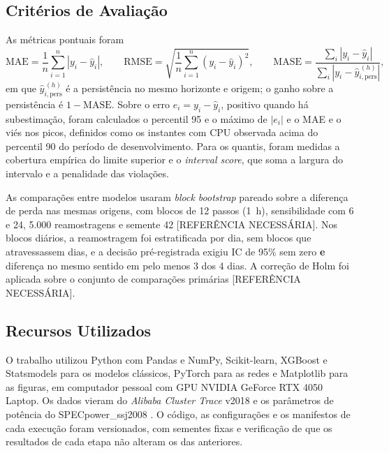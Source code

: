 \documentclass[a4paper,12pt]{article}
\newcommand{\refnec}{[REFERÊNCIA NECESSÁRIA]}
\begin{document}
\subsection{Critérios de Avaliação}
\label{sec:criterios}

As métricas pontuais foram
\begin{equation}
\mathrm{MAE} = \frac{1}{n}\sum_{i=1}^{n} |y_i - \hat{y}_i|, \qquad
\mathrm{RMSE} = \sqrt{\frac{1}{n}\sum_{i=1}^{n} (y_i - \hat{y}_i)^2}, \qquad
\mathrm{MASE} = \frac{\sum_{i} |y_i - \hat{y}_i|}{\sum_{i} |y_i - \hat{y}^{\,(h)}_{i,\mathrm{pers}}|},
\end{equation}
em que $\hat{y}^{\,(h)}_{i,\mathrm{pers}}$ é a persistência no mesmo horizonte e origem; o ganho sobre a persistência é $1 - \mathrm{MASE}$. Sobre o erro $e_i = y_i - \hat{y}_i$, positivo quando há subestimação, foram calculados o percentil 95 e o máximo de $|e_i|$ e o MAE e o viés nos picos, definidos como os instantes com CPU observada acima do percentil 90 do período de desenvolvimento. Para os quantis, foram medidas a cobertura empírica do limite superior e o \textit{interval score}, que soma a largura do intervalo e a penalidade das violações.

As comparações entre modelos usaram \textit{block bootstrap} pareado sobre a diferença de perda nas mesmas origens, com blocos de 12 passos (1~h), sensibilidade com 6 e 24, 5.000 reamostragens e semente 42 \refnec. Nos blocos diários, a reamostragem foi estratificada por dia, sem blocos que atravessassem dias, e a decisão pré-registrada exigiu IC de 95\% sem zero \textbf{e} diferença no mesmo sentido em pelo menos 3 dos 4 dias. A correção de Holm foi aplicada sobre o conjunto de comparações primárias \refnec.

\subsection{Recursos Utilizados}

O trabalho utilizou Python com Pandas e NumPy, Scikit-learn, XGBoost e Statsmodels para os modelos clássicos, PyTorch para as redes e Matplotlib para as figuras, em computador pessoal com GPU NVIDIA GeForce RTX 4050 Laptop. Os dados vieram do \textit{Alibaba Cluster Trace} v2018 \cite{alibaba2018clusterdata} e os parâmetros de potência do SPECpower\_ssj2008 \cite{spec2008power}. O código, as configurações e os manifestos de cada execução foram versionados, com sementes fixas e verificação de que os resultados de cada etapa não alteram os das anteriores.
\end{document}
